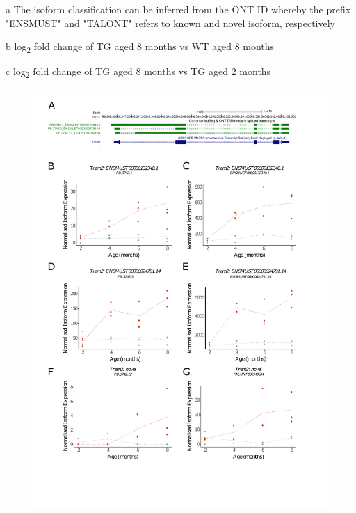 \begin{landscape}
\begin{table}[]
\begin{threeparttable}
	\begin{tablenotes}
	\footnotesize
	\item[a] The isoform classification can be inferred from the ONT ID whereby the prefix "ENSMUST" and "TALONT" refers to known and novel isoform, respectively 
	\item[b] log\textsubscript{2} fold change of TG aged 8 months vs WT aged 8 months
	\item[c] log\textsubscript{2} fold change of TG aged 8 months vs TG aged 2 months
	\end{tablenotes}
	\end{threeparttable}
\end{table}	
\end{landscape}


\begin{figure}[htp]
	\centering
	\includegraphics[page=1,trim={0 3cm 0 0},scale =0.75]{Figures/DiffCommon.pdf}

\end{figure}
